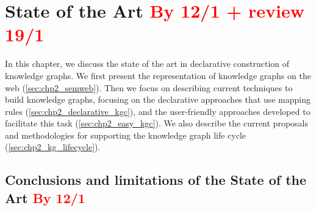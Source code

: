 \chapter{State of the Art \textcolor{red}{By 12/1 + review 19/1}}
\label{chapter:sota}

In this chapter, we discuss the state of the art in declarative construction of knowledge graphs. We first present the representation of knowledge graphs on the web (\cref{sec:chp2_semweb}). Then we focus on describing current techniques to build knowledge graphs, focusing on the declarative approaches that use mapping rules (\cref{sec:chp2_declarative_kgc}), and the user-friendly approaches developed to facilitate this task (\cref{sec:chp2_easy_kgc}). We also describe the current proposals and methodologies for supporting the knowledge graph life cycle (\cref{sec:chp2_kg_lifecycle}).











\section{Conclusions and limitations of the State of the Art \textcolor{red}{By 12/1}}
